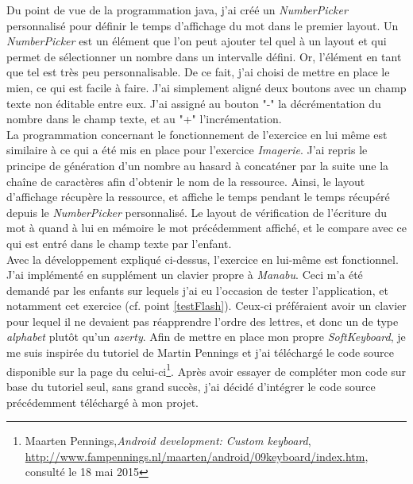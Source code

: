 Du point de vue de la programmation java, j'ai créé un \textit{NumberPicker} personnalisé pour définir le temps d'affichage du mot dans le premier layout. Un \textit{NumberPicker} est un élément que l'on peut ajouter tel quel à un layout et qui permet de sélectionner un nombre dans un intervalle défini. Or, l'élément en tant que tel est très peu personnalisable. De ce fait, j'ai choisi de mettre en place le mien, ce qui est facile à faire. J'ai simplement aligné deux boutons avec un champ texte non éditable entre eux. J'ai assigné au bouton "-" la décrémentation du nombre dans le champ texte, et au "+" l'incrémentation.\\

La programmation concernant le fonctionnement de l'exercice en lui même est similaire à ce qui a été mis en place pour l'exercice \textit{Imagerie}. J'ai repris le principe de génération d'un nombre au hasard à concaténer par la suite une la chaîne de caractères afin d'obtenir le nom de la ressource. Ainsi, le layout d'affichage récupère la ressource, et affiche le temps pendant le temps récupéré depuis le \textit{NumberPicker} personnalisé. Le layout de vérification de l'écriture du mot à quand à lui en mémoire le mot précédemment affiché, et le compare avec ce qui est entré dans le champ texte par l'enfant.\\


Avec la développement expliqué ci-dessus, l'exercice en lui-même est fonctionnel. J'ai implémenté en supplément un clavier propre à \textit{Manabu}. Ceci m'a été demandé par les enfants sur lequels j'ai eu l'occasion de tester l'application, et notamment cet exercice (cf. point \ref{testFlash}). Ceux-ci préféraient avoir un clavier pour lequel il ne devaient pas réapprendre l'ordre des lettres, et donc un de type \textit{alphabet} plutôt qu'un \textit{azerty}. Afin de mettre en place mon propre \textit{SoftKeyboard}, je me suis inspirée du tutoriel de Martin Pennings et j'ai téléchargé le code source disponible sur la page du celui-ci\footnote{Maarten Pennings,\textit{Android development: Custom keyboard}, \url{http://www.fampennings.nl/maarten/android/09keyboard/index.htm}, consulté le 18 mai 2015}. Après avoir essayer de compléter mon code sur base du tutoriel seul, sans grand succès, j'ai décidé d'intégrer le code source précédemment téléchargé à mon projet.\\

